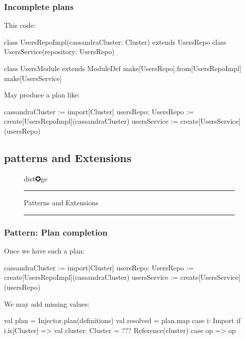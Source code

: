 \documentclass[usenames,dvipsnames]{beamer}
\begin{document}
\begin{frame}[fragile]
\frametitle{Incomplete plans}
This code: 
\begin{scalacode}
class UsersRepoImpl(cassandraCluster: Cluster) 
    extends UsersRepo
class UsersService(repository: UsersRepo)

class UsersModule extends ModuleDef {
  make[UsersRepo].from[UsersRepoImpl]
  make[UsersService]
}
\end{scalacode}

May produce a plan like:
\begin{textcode}
cassandraCluster     := import[Cluster]
usersRepo: UsersRepo := create[UsersRepoImpl](cassandraCluster)
usersService         := create[UsersService](usersRepo)
\end{textcode}
\end{frame}

\subsection{patterns and Extensions}
\begin{frame}
\begin{figure}
\Huge 
\color{RubineRed} dist✪ge
\noindent
\rule{\linewidth}{1mm}
\Large Patterns and Extensions
\rule{\linewidth}{1mm}
\end{figure}
\end{frame}

\begin{frame}[fragile]
\frametitle{Pattern: Plan completion}
Once we have such a plan:
\begin{textcode}
cassandraCluster     := import[Cluster]
usersRepo: UsersRepo := create[UsersRepoImpl](cassandraCluster)
usersService         := create[UsersService](usersRepo)
\end{textcode}

We may add missing values\footnotemark[1]:

\begin{scalacode}
val plan = Injector.plan(definitions)
val resolved = plan.map {
  case i: Import if i.is[Cluster] => 
    val cluster: Cluster = ???
    Reference(cluster)
  case op => op
}
\end{scalacode}
\end{frame}
\end{document}
